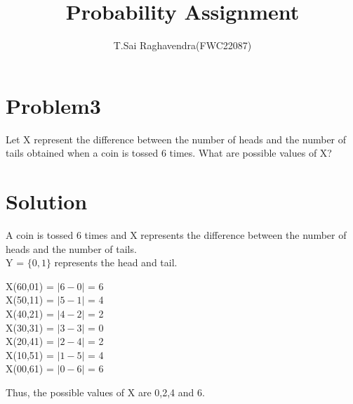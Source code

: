 \documentclass[journal,12pt,twocolumn]{IEEEtran}
\title{\mytitle}
\title{
Probability Assignment
}
\author{T.Sai Raghavendra(FWC22087)}
\begin{document}
\maketitle
\tableofcontents
\bigskip
\section{\textbf{Problem3}}
Let X represent the difference between the number of heads and the number of tails obtained when a coin is tossed 6 times. What are possible values of X?\\
\section{\textbf{Solution}}
A coin is tossed 6 times and X represents the difference between the number of heads and the number of tails.\\
Y = $\{0,1\}$ represents the head and tail.
\begin{center}
X(60,01) = $|6-0|$ = 6\\
X(50,11) = $|5-1|$ = 4\\
X(40,21) = $|4-2|$ = 2\\
X(30,31) = $|3-3|$ = 0\\
X(20,41) = $|2-4|$ = 2\\
X(10,51) = $|1-5|$ = 4\\
X(00,61) = $|0-6|$ = 6\\
\end{center}
Thus, the possible values of X are 0,2,4 and 6.
\end{document}
